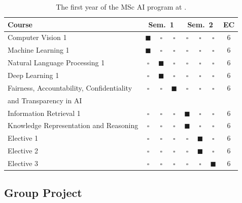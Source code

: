 \begin{table}[t]
\caption{The first year of the MSc AI program at \OurUniversity{}.}
\label{tab:msc_program}
\centering
\footnotesize
\setlength{\tabcolsep}{3pt}
\begin{tabular}{l c@{~}c@{~}c c@{~}c@{~}c c}
\toprule
Course & \multicolumn{3}{c}{Sem.\ 1} & \multicolumn{3}{c}{Sem.\ 2} & EC \\
\midrule
     Computer Vision 1 & $\blacksquare$ & $\square$ & $\square$ & $\square$ & $\square$ & $\square$ & 6 \\
     Machine Learning 1 & $\blacksquare$ & $\square$ & $\square$ & $\square$ & $\square$ & $\square$ & 6 \\
     Natural Language Processing 1 & $\square$ & $\blacksquare$ & $\square$ & $\square$ & $\square$ & $\square$ & 6 \\
     Deep Learning 1 & $\square$ & $\blacksquare$ & $\square$ & $\square$ & $\square$ & $\square$ & 6\\
     Fairness, Accountability, Confidentiality  & $\square$ & $\square$ & $\blacksquare$ & $\square$ & $\square$ & $\square$ & 6 \\
     and Transparency in AI \\
     Information Retrieval 1 & $\square$ & $\square$ & $\square$ & $\blacksquare$ & $\square$ & $\square$ & 6 \\
     Knowledge Representation and Reasoning & $\square$ & $\square$ & $\square$ & $\blacksquare$ & $\square$ & $\square$ & 6 \\
     Elective 1 & $\square$ & $\square$ & $\square$ & $\square$ & $\blacksquare$ & $\square$ & 6 \\
     Elective 2 & $\square$ & $\square$ & $\square$ & $\square$ & $\blacksquare$ & $\square$ & 6 \\
     Elective 3 & $\square$ & $\square$ & $\square$ & $\square$ & $\square$ & $\blacksquare$ & 6 \\
\bottomrule
\end{tabular}
\end{table}

\subsection{Group Project}
\label{section:assignment}

